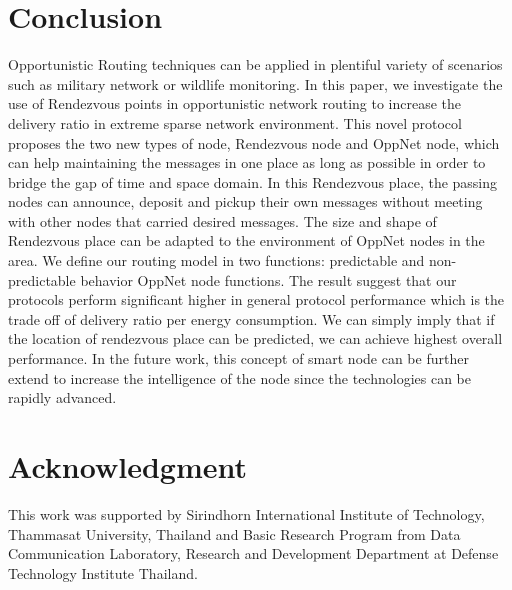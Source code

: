 \documentclass[conference]{IEEEtran}
\begin{document}
\section{Conclusion}

Opportunistic Routing techniques can be applied in  plentiful variety of scenarios such as military network or wildlife monitoring. 
%
In this paper, we investigate the use of Rendezvous points in opportunistic network routing to increase the delivery ratio in extreme sparse network environment.
%
This novel protocol proposes the two new types of node, Rendezvous node and OppNet node, which can help maintaining the messages in one place as long as possible in order to bridge the gap of time and space domain.
%
In this Rendezvous place, the passing nodes can announce, deposit and pickup their own messages without meeting with other nodes that carried desired messages.
%
The size and shape of  Rendezvous place can be adapted to the environment of OppNet nodes in the area.
%
We define our routing model in two functions: predictable  and non-predictable behavior OppNet node functions.
%
The result suggest that our protocols perform significant higher in general protocol performance which is the trade off of delivery ratio per energy consumption.
%
We can simply imply that if the location of rendezvous place can be predicted, we can achieve highest overall performance.
In the future work, this concept of smart node can be further extend to increase the intelligence of the node since the technologies can be rapidly advanced.

\section*{Acknowledgment}

This work was supported by Sirindhorn International Institute of Technology, Thammasat University, Thailand and Basic Research Program from Data Communication Laboratory, Research and Development Department at Defense Technology Institute Thailand.



\end{document}
